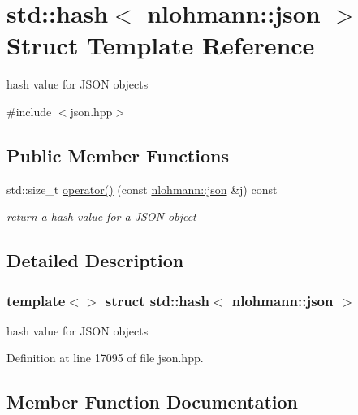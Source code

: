 \hypertarget{structstd_1_1hash_3_01nlohmann_1_1json_01_4}{}\section{std\+:\+:hash$<$ nlohmann\+:\+:json $>$ Struct Template Reference}
\label{structstd_1_1hash_3_01nlohmann_1_1json_01_4}


hash value for J\+S\+ON objects  




{\ttfamily \#include $<$json.\+hpp$>$}

\subsection*{Public Member Functions}
\begin{DoxyCompactItemize}
\item 
std\+::size\+\_\+t \hyperlink{structstd_1_1hash_3_01nlohmann_1_1json_01_4_aec1567d1fa47dbe5b77954dce3a55b64}{operator()} (const \hyperlink{namespacenlohmann_a2bfd99e845a2e5cd90aeaf1b1431f474}{nlohmann\+::json} \&j) const
\begin{DoxyCompactList}\small\item\em return a hash value for a J\+S\+ON object \end{DoxyCompactList}\end{DoxyCompactItemize}


\subsection{Detailed Description}
\subsubsection*{template$<$$>$\newline
struct std\+::hash$<$ nlohmann\+::json $>$}

hash value for J\+S\+ON objects 

Definition at line 17095 of file json.\+hpp.



\subsection{Member Function Documentation}
\mbox{\label{structstd_1_1hash_3_01nlohmann_1_1json_01_4_aec1567d1fa47dbe5b77954dce3a55b64}} 
